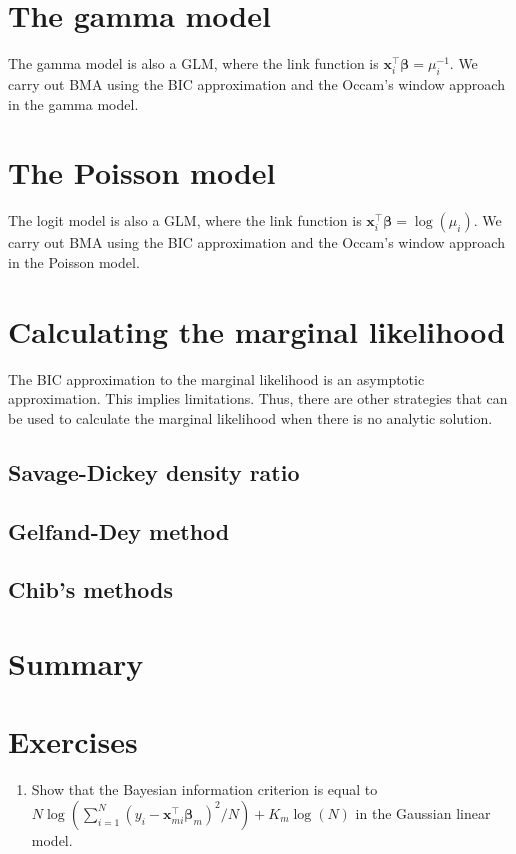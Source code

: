 \section{The gamma model}\label{sec10_4}
The gamma model is also a GLM, where the link function is $\bm{x}_i^{\top}\bm{\beta}=\mu_i^{-1}$.
We carry out BMA using the BIC approximation and the Occam's window approach in the gamma model.

\section{The Poisson model}\label{sec10_5}
The logit model is also a GLM, where the link function is $\bm{x}_i^{\top}\bm{\beta}=\log(\mu_i)$.
We carry out BMA using the BIC approximation and the Occam's window approach in the Poisson model.


\section{Calculating the marginal likelihood}\label{sec10_6}

The BIC approximation to the marginal likelihood is an asymptotic approximation. This implies limitations. Thus, there are other strategies that can be used to calculate the marginal likelihood when there is no analytic solution.

\subsection{Savage-Dickey density ratio}\label{sec10_11}

\subsection{Gelfand-Dey method}\label{sec10_12}

\subsection{Chib's methods}\label{sec10_13}

\section{Summary}\label{sec10_7}

\section{Exercises}\label{sec10_8}

\begin{enumerate}
	\item Show that the Bayesian information criterion is equal to $N\log(\sum_{i=1}^N(y_i-\bm{x}_{mi}^{\top}\bm{\beta}_m)^2/N)+K_m\log(N)$ in the Gaussian linear model. 
	
\end{enumerate}